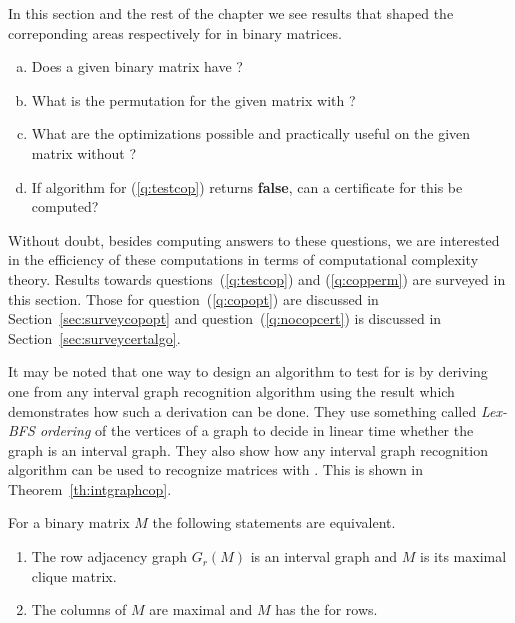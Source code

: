 In this section and the rest of the chapter we see results that shaped the
correponding areas respectively for \cop in binary matrices.

\begin{enumerate}[a.]
\singlespacing
\item \label{q:testcop} Does a given binary matrix have \COP?
\item \label{q:copperm} What is the \COP permutation for the given matrix with \COP?
\item \label{q:copopt} What are the optimizations possible and practically useful on
  the given matrix without \COP?
\item \label{q:nocopcert} If algorithm for (\ref{q:testcop}) returns
  \textbf{false}, can a certificate for this be computed?
\end{enumerate}

Without doubt, besides computing answers to these questions, we are
interested in the efficiency of these computations in terms of
computational complexity theory. Results towards
questions~(\ref{q:testcop}) and (\ref{q:copperm}) are surveyed in this
section. Those for question~(\ref{q:copopt}) are discussed in
Section~\ref{sec:surveycopopt} and question~(\ref{q:nocopcert}) is discussed
in Section~\ref{sec:surveycertalgo}.

It may be noted that one way to design an algorithm to test for \COP
is by deriving one from any interval graph recognition algorithm using
the result \cite{hmpv00} \cite[Th~2.7]{d08phd} which demonstrates how
such a derivation can be done.  They use something called {\em Lex-BFS
  ordering} of the vertices of a graph to decide in linear time
whether the graph is an interval graph. They also show how any
interval graph recognition algorithm can be used to recognize matrices
with \COP. This is shown in Theorem~\ref{th:intgraphcop}.

\begin{theoremsansproof}
  \label{th:intgraphcop}
  For a binary matrix $M$ the following statements are equivalent.
  \begin{enumerate}
  \item The row adjacency graph $G_r(M)$ is an interval graph and $M$
    is its maximal clique matrix.
  \item The columns of $M$ are maximal and $M$ has the \COP for rows.
  \end{enumerate}
\end{theoremsansproof}


